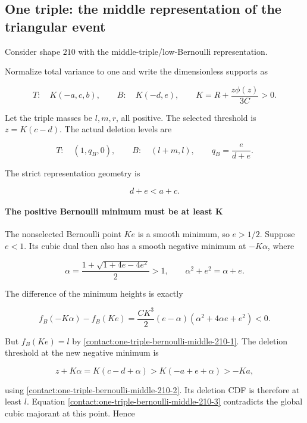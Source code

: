 \subsection{One triple: the middle representation of the triangular event}\label{contact:one-triple-bernoulli-middle-210}


Consider shape $210$ with the middle-triple/low-Bernoulli representation.

Normalize total variance to one and write the dimensionless supports as

\[
 T:\quad K(-a,c,b),\qquad B:\quad K(-d,e),\qquad
 K=R+\frac{z\phi(z)}{3C}>0.
\]

Let the triple masses be $l,m,r$, all positive. The selected threshold
is $z=K(c-d)$. The actual deletion levels are

\[
 T:\quad (1,q_B,0),\qquad
 B:\quad (l+m,l),\qquad q_B=\frac{e}{d+e}.
\tag{B.11.1}\label{contact:one-triple-bernoulli-middle-210-1}
\]

The strict representation geometry is

\[
 d+e<a+c.
\tag{B.11.2}\label{contact:one-triple-bernoulli-middle-210-2}
\]

\paragraph{The positive Bernoulli minimum must be at least K}

The nonselected Bernoulli point $Ke$ is a smooth minimum, so $e>1/2$.
Suppose $e<1$. Its cubic dual then also has a smooth negative minimum
at $-K \alpha$, where

\[
 \alpha=\frac{1+\sqrt{1+4e-4e^2}}2>1,
 \qquad \alpha^2+e^2=\alpha+e.
\]

The difference of the minimum heights is exactly

\[
 f_B(-K\alpha)-f_B(Ke)
 =\frac{CK^3}{2}(e-\alpha)
                     (\alpha^2+4\alpha e+e^2)<0.
\tag{B.11.3}\label{contact:one-triple-bernoulli-middle-210-3}
\]

But $f_B(Ke)=l$ by \eqref{contact:one-triple-bernoulli-middle-210-1}. The deletion threshold at the new negative
minimum is

\[
 z+K\alpha=K(c-d+\alpha)>K(-a+e+\alpha)>-Ka,
\]

using \eqref{contact:one-triple-bernoulli-middle-210-2}. Its deletion CDF is therefore at least $l$. Equation \eqref{contact:one-triple-bernoulli-middle-210-3}
contradicts the global cubic majorant at this point. Hence

